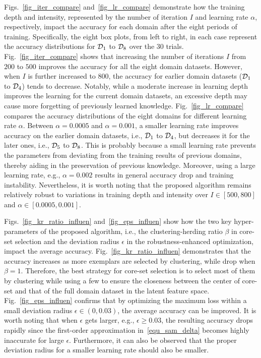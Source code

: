 Figs.~\ref{fig_iter_compare} and~\ref{fig_lr_compare} demonstrate how the training depth and intensity, represented by the number of iteration $I$ and learning rate $\alpha$, respectively, impact the accuracy for each domain after the eight periods of training.
Specifically, the eight box plots, from left to right, in each case represent the accuracy distributions for $\mathcal{D}_1$ to $\mathcal{D}_8$ over the 30 trials.
Fig.~\ref{fig_iter_compare} shows that increasing the number of iterations $I$ from $200$ to $500$ improves the accuracy for all the eight domain datasets.
However, when $I$ is further increased to $800$, the accuracy for earlier domain datasets ($\mathcal{D}_1$ to $\mathcal{D}_4$) tends to decrease.
Notably, while a moderate increase in learning depth improves the learning for the current domain datasets, an excessive depth may cause more forgetting of previously learned knowledge.
Fig.~\ref{fig_lr_compare} compares the accuracy distributions of the eight domains for different learning rate $\alpha$.
Between $\alpha=0.0005$ and $\alpha=0.001$, a smaller learning rate improves accuracy on the earlier domain datasets, i.e., $\mathcal{D}_1$ to $\mathcal{D}_4$, but decreases it for the later ones, i.e., $\mathcal{D}_5$ to $\mathcal{D}_8$.
This is probably because a small learning rate prevents the parameters from deviating from the training results of previous domains, thereby aiding in the preservation of previous knowledge. 
Moreover, using a large learning rate, e.g., $\alpha=0.002$ results in general accuracy drop and training instability.
Nevertheless, it is worth noting that the proposed algorithm remains relatively robust to variations in training depth and intensity over $I\in[500,800]$ and $\alpha\in[0.0005,0.001]$.




Figs.~\ref{fig_kr_ratio_influen} and~\ref{fig_eps_influen} show how the two key hyper-parameters of the proposed algorithm, i.e., the clustering-herding ratio $\beta$ in core-set selection and the deviation radius $\epsilon$ in the robustness-enhanced optimization, impact the average accuracy.
Fig.~\ref{fig_kr_ratio_influen} demonstrates that the accuracy increases as more exemplars are selected by clustering, while drop when $\beta=1$.
Therefore, the best strategy for core-set selection is to select most of them by clustering while using a few to ensure the closeness between the center of core-set and that of the full domain dataset in the latent feature space.
Fig.~\ref{fig_eps_influen} confirms that by optimizing the maximum loss within a small deviation radius $\epsilon\in(0,0.03)$, the average accuracy can be improved.
It is worth noting that when $\epsilon$ gets larger, e.g., $\epsilon\geq 0.03$, the resulting accuracy drops rapidly since the first-order approximation in~\eqref{equ_sam_delta} becomes highly inaccurate for large $\epsilon$.
Furthermore, it can also be observed that the proper deviation radius for a smaller learning rate should also be smaller.


\endinput
